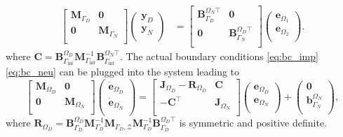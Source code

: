 \begin{equation}
\begin{aligned}
\begin{bmatrix}
\mathbf{M}_{\Gamma_D} & \mathbf{0}  \\
\mathbf{0} & \mathbf{M}_{\Gamma_N} \\
\end{bmatrix}
\begin{pmatrix}
\mathbf{y}_{D} \\
\mathbf{y}_{N} \\
\end{pmatrix}
&= 
\begin{bmatrix}
\mathbf{B}_{\Gamma_D}^{\Omega_N \top} & \mathbf{0} \\
\mathbf{0} & \mathbf{B}_{\Gamma_N}^{\Omega_D \top} \\
\end{bmatrix}\begin{pmatrix}
{\mathbf{e}}_{\Omega_1} \\
{\mathbf{e}}_{\Omega_2} \\
\end{pmatrix}.
\end{aligned}
\end{equation}
where $\mathbf{C} = \mathbf{B}_{\Gamma_{\text{int}}}^{\Omega_D} \mathbf{M}_{\Gamma_{\text{int}}}^{-1} \mathbf{B}_{\Gamma_{\text{int}}}^{\Omega_N \top}$. The actual boundary conditions \eqref{eq:bc_imp} \eqref{eq:bc_neu} can be plugged into the system leading to 
\begin{equation}\label{eq:pHfindim_waves_phode_bc}
\begin{bmatrix}
\mathbf{M}_{\Omega_D} & \mathbf{0} \\
\mathbf{0} & \mathbf{M}_{\Omega_N} \\
\end{bmatrix}
\begin{pmatrix}
\dot{\mathbf{e}}_{\Omega_D} \\
\dot{\mathbf{e}}_{\Omega_N} \\
\end{pmatrix}
= \begin{bmatrix}
\mathbf{J}_{\Omega_D} - \mathbf{R}_{\Omega_D}  & \mathbf{C}\\
-\mathbf{C}^\top & \mathbf{J}_{\Omega_N} \\
\end{bmatrix} 
\begin{pmatrix}
{\mathbf{e}}_{\Omega_D} \\
{\mathbf{e}}_{\Omega_N} \\
\end{pmatrix} + 
\begin{pmatrix}
\mathbf{0}\\
\mathbf{b}_{\Gamma_N}^{\Omega_N}\\
\end{pmatrix},
\end{equation}
where $\mathbf{R}_{\Omega_D} = \mathbf{B}_{\Gamma_D}^{\Omega_D} \mathbf{M}_{\Gamma_D}^{-1} \mathbf{M}_{\Gamma_D, \mathcal{Z}} \mathbf{M}_{\Gamma_D}^{-1} \mathbf{B}_{\Gamma_D}^{\Omega_D \top}$ is symmetric and positive definite.

